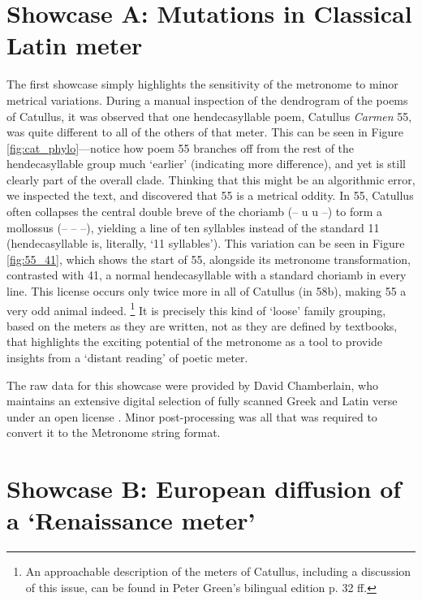 \documentclass[
    hf
]{ceurart}
\begin{document}
\section{Showcase A: Mutations in Classical Latin meter}

The first showcase simply highlights the sensitivity of the metronome to minor metrical variations. During a manual inspection of the dendrogram of the poems of Catullus, it was observed that one hendecasyllable poem, Catullus \textit{Carmen} 55, was quite different to all of the others of that meter. This can be seen in Figure \ref{fig:cat_phylo}---notice how poem 55 branches off from the rest of the hendecasyllable group much `earlier' (indicating more difference), and yet is still clearly part of the overall clade. Thinking that this might be an algorithmic error, we inspected the text, and discovered that 55 is a metrical oddity. In 55, Catullus often collapses the central double breve of the choriamb (– u u –) to form a mollossus (– – –), yielding a line of ten syllables instead of the standard 11 (hendecasyllable is, literally, `11 syllables'). This variation can be seen in Figure \ref{fig:55_41}, which shows the start of 55, alongside its metronome transformation, contrasted with 41, a normal hendecasyllable with a standard choriamb in every line. This license occurs only twice more in all of Catullus (in 58b), making 55 a very odd animal indeed.%
%
\footnote{An approachable description of the meters of Catullus, including a discussion of this issue, can be found in Peter Green’s bilingual edition  \cite{catullus_poems_2005} p. 32 ff.}
%
It is precisely this kind of `loose' family grouping, based on the meters as they are written, not as they are defined by textbooks, that highlights the exciting potential of the metronome as a tool to provide insights from a `distant reading' of poetic meter.

The raw data for this showcase were provided by David Chamberlain, who maintains an extensive digital selection of fully scanned Greek and Latin verse under an open license \cite{hypotactic}. Minor post-processing was all that was required to convert it to the Metronome string format.

\section{Showcase B: European diffusion of a `Renaissance meter'}
\end{document}
